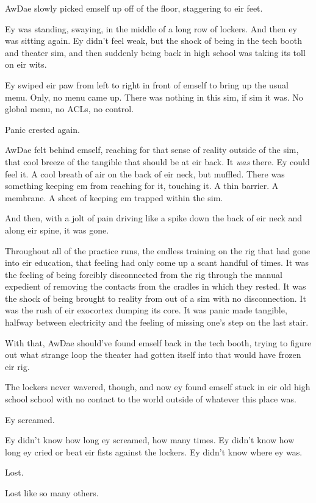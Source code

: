 AwDae slowly picked emself up off of the floor, staggering to eir feet.

Ey was standing, swaying, in the middle of a long row of lockers. And then ey was sitting again. Ey didn't feel weak, but the shock of being in the tech booth and theater sim, and then suddenly being back in high school was taking its toll on eir wits.

Ey swiped eir paw from left to right in front of emself to bring up the usual menu. Only, no menu came up. There was nothing in this sim, if sim it was. No global menu, no ACLs, no control.

Panic crested again.

AwDae felt behind emself, reaching for that sense of reality outside of the sim, that cool breeze of the tangible that should be at eir back. It \emph{was} there. Ey could feel it. A cool breath of air on the back of eir neck, but muffled. There was something keeping em from reaching for it, touching it. A thin barrier. A membrane. A sheet of keeping em trapped within the sim.

And then, with a jolt of pain driving like a spike down the back of eir neck and along eir spine, it was gone.

Throughout all of the practice runs, the endless training on the rig that had gone into eir education, that feeling had only come up a scant handful of times. It was the feeling of being forcibly disconnected from the rig through the manual expedient of removing the contacts from the cradles in which they rested. It was the shock of being brought to reality from out of a sim with no disconnection. It was the rush of eir exocortex dumping its core. It was panic made tangible, halfway between electricity and the feeling of missing one's step on the last stair.

With that, AwDae should've found emself back in the tech booth, trying to figure out what strange loop the theater had gotten itself into that would have frozen eir rig.

The lockers never wavered, though, and now ey found emself stuck in eir old high school school with no contact to the world outside of whatever this place was.

Ey screamed.

Ey didn't know how long ey screamed, how many times. Ey didn't know how long ey cried or beat eir fists against the lockers. Ey didn't know where ey was.

Lost.

Lost like so many others.

